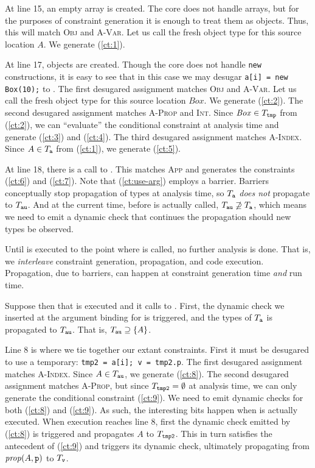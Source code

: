 At line 15, an empty array is created. The core does not handle arrays, but
for the purposes of constraint generation it is enough to treat them as
objects. Thus, this will match \textsc{Obj} and \textsc{A-Var}. Let us call
the fresh object type for this source location $A$. We generate (\ref{ct:1}).

At line 17,  objects are created. Though the core does not handle
\lstinline{new} constructions, it is easy to see that in this case we may
desugar \lstinline{a[i] = new Box(10);} to . The first desugared assignment matches \textsc{Obj} and
\textsc{A-Var}. Let us call the fresh object type for this source location
$\mathit{Box}$. We generate (\ref{ct:2}).  The second desugared assignment
matches \textsc{A-Prop} and \textsc{Int}. Since $\mathit{Box} \in
T_{\texttt{tmp}}$ from (\ref{ct:2}), we can ``evaluate'' the conditional
constraint at analysis time and generate (\ref{ct:3}) and (\ref{ct:4}).  The
third desugared assignment matches \textsc{A-Index}. Since $A \in
T_{\texttt{a}}$ from (\ref{ct:1}), we generate (\ref{ct:5}).

At line 18, there is a call to . This matches \textsc{App} and
generates the constraints (\ref{ct:6}) and (\ref{ct:7}). Note that
(\ref{ct:use-arg}) employs a barrier. Barriers conceptually stop propagation
of types at analysis time, so $T_{\texttt{a}}$ \emph{does not} propagate to
$T_{\texttt{au}}$. And at the current time, before  is actually
called, $T_{\texttt{au}} \not\supseteq T_{\texttt{a}}$, which means we need to
emit a dynamic check that continues the propagation should new types be
observed.

Until  is executed to the point where  is called, no
further analysis is done. That is, we \emph{interleave} constraint generation,
propagation, and code execution. Propagation, due to barriers, can happen at
constraint generation time \emph{and} run time.

Suppose then that  is executed and it calls to . First,
the dynamic check we inserted at the argument binding for  is
triggered, and the types of $T_{\texttt{a}}$ is propagated to
$T_{\texttt{au}}$. That is, $T_{\texttt{au}} \supseteq \{A\}$.

Line 8 is where we tie together our extant constraints. First it must be
desugared to use a temporary: \lstinline{tmp2 = a[i]; v = tmp2.p}. The first
desugared assignment matches \textsc{A-Index}. Since $A \in T_{\texttt{au}}$, we
generate (\ref{ct:8}). The second desugared assignment matches
\textsc{A-Prop}, but since $T_{\texttt{tmp2}} = \emptyset$ at analysis time, we
can only generate the conditional constraint (\ref{ct:9}). We need to emit
dynamic checks for both (\ref{ct:8}) and (\ref{ct:9}). As such, the
interesting bits happen when  is actually executed. When execution
reaches line 8, first the dynamic check emitted by (\ref{ct:8}) is triggered
and propagates $A$ to $T_{\texttt{tmp2}}$. This in turn satisfies the antecedent
of (\ref{ct:9}) and triggers its dynamic check, ultimately propagating
 from $\mathit{prop}(A, \texttt{p})$ to $T_{\texttt{v}}$.

